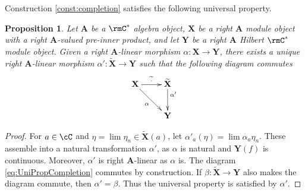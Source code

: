 \documentclass[11pt,reqno]{amsart}
\newcommand{\bb}[1]{\mathbf{#1}}
\numberwithin{equation}{section}
\theoremstyle{plain}
\newtheorem{prop}[thm]{Proposition}
\begin{document}
Construction \ref{const:completion} satisfies the following universal property.

\begin{prop} 
Let $\bb A$ be a $\rmC^*$ algebra object, $\bb X$ be a right $\bb A$ module object with a right $\bb A$-valued pre-inner product, and let $\bb Y$ be a right $\bb A$ Hilbert $\rmC^*$ module object.
Given a right $\bb A$-linear morphism $\alpha \colon \bb X \to \bb Y$, there exists a unique right $\bb A$-linear morphism $\alpha' \colon \widetilde{\bb X} \to \bb Y$ such that the following diagram commutes
\begin{equation}
\label{eq:UniPropCompletion}
\xymatrix{\bb X \ar[r]^{\widetilde{\cdot}} \ar[dr]_{\alpha} & \widetilde{\bb X} \ar[d]^<<<{\alpha'} \\ & \bb Y}
\end{equation}
\end{prop}

\begin{proof}
For $a \in \cC$ and $\eta = \lim \eta_n \in \widetilde{\bb X}(a)$, let $\alpha'_a(\eta) = \lim \alpha_a \eta_n$.
These assemble into a natural transformation $\alpha'$, as $\alpha$ is natural and $\bb Y(f)$ is continuous.
Moreover, $\alpha'$ is right $\bb A$-linear as $\alpha$ is.
The diagram \ref{eq:UniPropCompletion} commutes by construction.
If $\beta \colon \widetilde{\bb X} \to \bb Y$ also makes the diagram commute, then $\alpha' = \beta$.
Thus the universal property is satisfied by $\alpha'$.
\end{proof}
\end{document}
